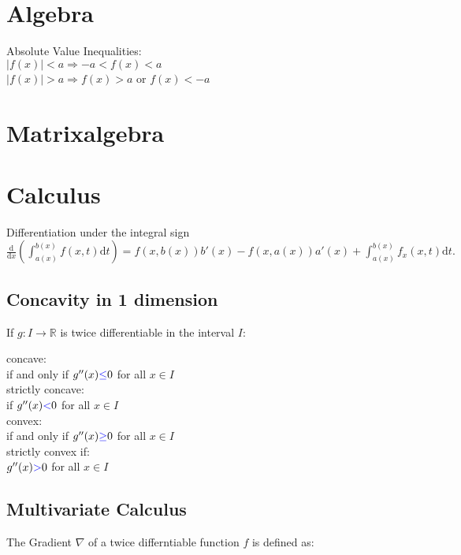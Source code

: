 \section{Algebra}
Absolute Value Inequalities:\\
$ |f(x)| < a  \Rightarrow  -a < f(x) < a$\\ 
$|f(x)| > a  \Rightarrow f(x) > a$ or $f(x) < -a$\\
\section{Matrixalgebra}
\section{Calculus}

Differentiation under the integral sign\\
$\frac{\text{d}}{\text{d}x}\left( \int_{a(x)}^{b(x)}f(x,t)\text{d}t \right ) = f(x,b(x))b'(x)-f(x,a(x))a'(x)+\int_{a(x)}^{b(x)}f_x(x,t)\text{d}t.$

\subsection*{Concavity in 1 dimension}
If $g:I \to \mathbb {R}$ is twice differentiable in the interval $I$:

concave:\\ 
if and only if $g^{\prime \prime }(x) {\color{blue}{\leq }}  0$ for all $x \in I$\\

strictly concave:\\
if $g^{\prime \prime }(x) {\color{blue}{<}}  0$ for all $x \in I$\\

convex:\\ 
if and only if $g^{\prime \prime }(x) {\color{blue}{\geq }}  0$ for all $x \in I$\\

strictly convex if:\\
$g^{\prime \prime }(x) {\color{blue}{>}}  0$ for all $x \in I$\\

\subsection*{Multivariate Calculus}
The Gradient $\nabla$ of a twice differntiable function $f$ is defined as:

